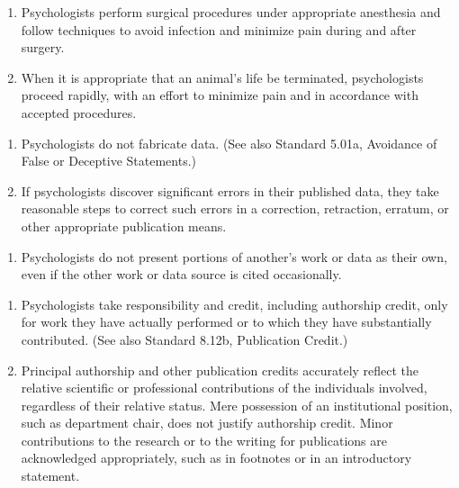 \begin{fullwidth}
\begin{enumerate}
\item  Psychologists perform surgical procedures under appropriate anesthesia and follow techniques to avoid infection and minimize pain during and after surgery.


\item  When it is appropriate that an animal's life be terminated, psychologists proceed rapidly, with an effort to minimize pain and in accordance with accepted procedures.

\end{enumerate}



\begin{enumerate}
\item 
Psychologists do not fabricate data. (See also Standard 5.01a, Avoidance of False or Deceptive Statements.)
 

\item If psychologists discover significant errors in their published data, they take reasonable steps to correct such errors in a correction, retraction, erratum, or other appropriate publication means.
\end{enumerate}



\begin{enumerate}

\item Psychologists do not present portions of another's work or data as their own, even if the other work or data
source is cited occasionally. 

\end{enumerate}




\begin{enumerate}

\item Psychologists take responsibility and credit, including authorship credit, only for work they have actually performed or to which they have substantially contributed. (See also Standard 8.12b, Publication Credit.)


\item Principal authorship and other publication credits accurately reflect the relative scientific or professional contributions of the individuals involved, regardless of their relative status. Mere possession of an institutional position, such as department chair, does not justify authorship credit. Minor contributions to the research or to the writing for publications are acknowledged appropriately, such as in footnotes or in an introductory statement.



\end{enumerate}
\end{fullwidth}
